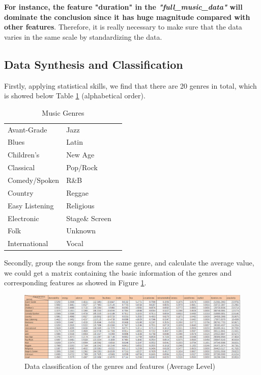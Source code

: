 \documentclass[12pt]{article}
\begin{document}
\textbf{For instance, the feature "duration" in the \emph{"full\_music\_data"} will dominate the conclusion since it has huge magnitude compared with other features}. Therefore, it is really necessary to make sure that the data varies in the same scale by standardizing the data.
\subsection{Data Synthesis and Classification}
Firstly, applying statistical skills, we find that there are 20 genres in total, which is showed below Table \ref{Music Genres} (alphabetical order).
\begin{table} [H]
\begin{center}
\begin{tabular}{p{80pt}p{80pt}p{80pt}}
\toprule
\midrule
Avant-Grade     & Jazz\\
Blues & Latin\\
Children's & New Age\\
Classical & Pop/Rock\\
Comedy/Spoken & R\&B\\
Country & Reggae\\
Easy Listening & Religious\\
Electronic & Stage\& Screen \\
Folk & Unknown\\
International & Vocal\\
\bottomrule
\end{tabular}
\end{center}
\caption{Music Genres}
\label{Music Genres}
\end{table}
Secondly, group the songs from the same genre, and calculate the average value, we could get a matrix containing the basic information of the genres and corresponding features as showed in Figure \ref{Data}.\\
\begin{figure}[H]
\label{fig:aa}
\small
\centering
\includegraphics[width=12cm]{figures/Q2_originaldata.png}
\caption{Data classification of the genres and features (Average Level)}
\label{Data}
\end{figure}
\end{document}
